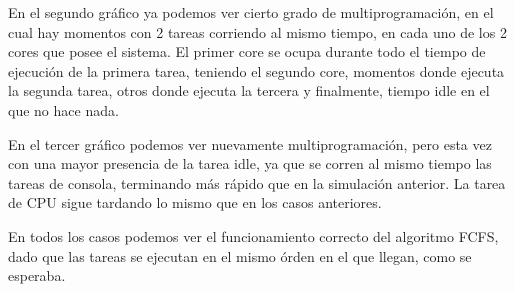 En el segundo gráfico ya podemos ver cierto grado de multiprogramación, en el cual hay momentos con 2 tareas corriendo al mismo tiempo, en cada uno de los 2 cores que posee el sistema. El primer core se ocupa durante todo el tiempo de ejecución de la primera tarea, teniendo el segundo core, momentos donde ejecuta la segunda tarea, otros donde ejecuta la tercera y finalmente, tiempo idle en el que no hace nada.

En el tercer gráfico podemos ver nuevamente multiprogramación, pero esta vez con una mayor presencia de la tarea idle, ya que se corren al mismo tiempo las tareas de consola, terminando más rápido que en la simulación anterior. La tarea de CPU sigue tardando lo mismo que en los casos anteriores.

En todos los casos podemos ver el funcionamiento correcto del algoritmo FCFS, dado que las tareas se ejecutan en el mismo órden en el que llegan, como se esperaba.